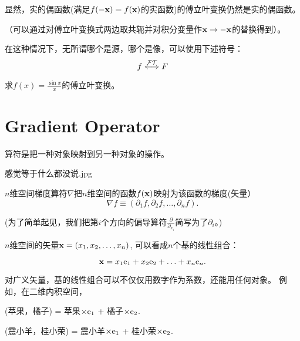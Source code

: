 \documentclass[CJK]{beamer}
\begin{document}
\begin{frame}
  \bch
  显然，实的偶函数(满足$f(-{\mathbf{x}}) = f({\mathbf{x}})$的实函数)的傅立叶变换仍然是实的偶函数。

  {\scriptsize（可以通过对傅立叶变换式两边取共轭并对积分变量作${\mathbf{x}} \rightarrow -{\mathbf{x}}$的替换得到）。}

  \skipline

  在这种情况下，无所谓哪个是源，哪个是像，可以使用下述符号：
  $$ f \stackrel{\mathcal{FT}}{\Longleftrightarrow} F $$
  \ech
\end{frame}

\begin{frame}
  \bch
  
  求$f(x) = \frac{\sin x}{x}$的傅立叶变换。
  \ech
\end{frame}

\section{Gradient Operator}

\begin{frame}
  \bch
      {\blue 算符是把一种对象映射到另一种对象的操作}。


      \bcenter
      
      感觉等于什么都没说.jpg
      \ecenter
      \ech
\end{frame}


\begin{frame}
  \bch
  \bex
  $n$维空间梯度算符$\nabla$把$n$维空间的函数$f({\mathbf{x}})$映射为该函数的梯度(矢量）
    $$ \nabla f \equiv (\partial_1 f, \partial_2 f,\ldots, \partial_n f) .$$
    
    (为了简单起见，我们把第$i$个方向的偏导算符$\frac{\partial}{\partial_{x_i}}$简写为了$\partial_i$。)
  \eex

  \ech
\end{frame}


\begin{frame}
  \bch
  $n$维空间的矢量${\mathbf{x}} = (x_1, x_2, \ldots, x_n)$, 可以看成$n$个基的线性组合：

  $${\mathbf{x}} = x_1\mathrm{e}_1 + x_2\mathrm{e}_2 + \ldots + x_n\mathrm{e}_n. $$

  对广义矢量，{\blue 基的线性组合可以不仅仅用数字作为系数，还能用任何对象。}
  例如，在二维内积空间，

  \skipline
  
  (苹果，橘子) = 苹果$\times \mathrm{e}_1$ + 橘子$\times\mathrm{e}_2$.

  \skipline
  
  (震小羊，桂小荣) = 震小羊$\times \mathrm{e}_1$ + 桂小荣$\times\mathrm{e}_2$.  
  
  \ech
\end{frame}
\end{document}
